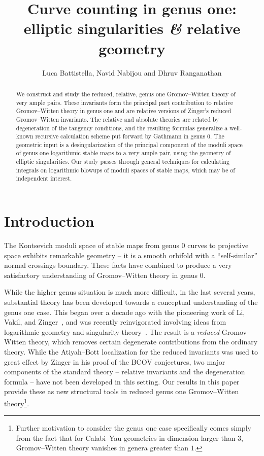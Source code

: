 \documentclass[11pt]{amsart}
\title[Curve counting in genus one: elliptic singularities and relative geometry]{Curve counting in genus one: elliptic singularities {\it \&} relative geometry}
\author{Luca Battistella, Navid Nabijou and Dhruv Ranganathan}
\date{\thismonthyear}
\theoremstyle{definition}
\theoremstyle{definition}
\begin{document}
\begin{abstract}
We construct and study the reduced, relative, genus one Gromov--Witten theory of very ample pairs. These invariants form the principal part contribution to relative Gromov--Witten theory in genus one and are relative versions of Zinger's reduced Gromov--Witten invariants. The relative and absolute theories are related by degeneration of the tangency conditions, and the resulting formulas generalize a well-known recursive calculation scheme put forward by Gathmann in genus $0$. {The geometric input is a desingularization of the principal component of the moduli space of genus one logarithmic stable maps to a very ample pair, using the geometry of elliptic singularities. Our study passes through general techniques for calculating integrals on logarithmic blowups of moduli spaces of stable maps, which may be of independent interest.}
\end{abstract}

\maketitle

\appendixtitletocoff
\tableofcontents

\setcounter{section}{-1}
\section{Introduction}

The Kontsevich moduli space of stable maps from genus $0$ curves to projective space exhibits remarkable geometry -- it is a smooth orbifold with a ``self-similar'' normal crossings boundary. These facts have combined to produce a very {satisfactory} understanding of Gromov--Witten theory in genus $0$. 

While the higher genus situation is much more difficult, in the last several years, substantial theory has been developed towards a conceptual understanding of the genus one case. This began over a decade ago with the pioneering work of Li, Vakil, and Zinger~\cite{redgone,VZ,LZ,lz2,zingerstvsred,zingred}, and was recently reinvigorated involving ideas from logarithmic geometry and singularity theory~\cite{BCM18,CM18,HL,RSPW,RSPW2,SMY1,VISC}. The result is a \textit{reduced} Gromov--Witten theory, which removes certain degenerate contributions from the ordinary theory. While the Atiyah--Bott localization for the reduced invariants was used to great effect by Zinger in his proof of the BCOV conjectures, two major components of the standard theory -- relative invariants and the degeneration formula -- have not been developed in this setting. Our results in this paper provide these as new {structural} tools in reduced genus one Gromov--Witten theory\footnote{Further motivation to consider the genus one case specifically comes simply from the fact that for Calabi--Yau geometries in dimension larger than $3$, Gromov--Witten theory vanishes in genera greater than $1$.}. 
\end{document}
